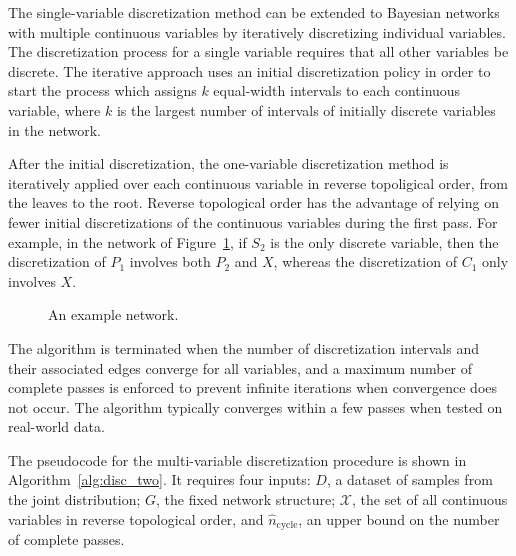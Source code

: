 \documentclass[twoside,11pt]{article}
\newcommand{\cX}{\mathcal{X}} %
\newcommand{\maxpasses}{\hat{n}_\text{cycle}}
\begin{document}
The single-variable discretization method can be extended to Bayesian networks with multiple continuous variables by iteratively discretizing individual variables.
The discretization process for a single variable requires that all other variables be discrete.
The iterative approach uses an initial discretization policy in order to start the process which assigns $k$ equal-width intervals to each continuous variable, where $k$ is the largest number of intervals of initially discrete variables in the network.

After the initial discretization, the one-variable discretization method is iteratively applied over each continuous variable in reverse topoligical order, from the leaves to the root.
Reverse topological order has the advantage of relying on fewer initial discretizations of the continuous variables during the first pass.
For example, in the network of Figure~\ref{fig:example_networks}, if $S_2$ is the only discrete variable, then the discretization of $P_1$ involves both $P_2$ and $X$, whereas the discretization of $C_1$ only involves $X$.

\begin{figure}[ht]
 \centering
     
  \caption{An example network.}
   \label{fig:example_networks}
\end{figure}

The algorithm is terminated when the number of discretization intervals and their associated edges converge for all variables, and a maximum number of complete passes is enforced to prevent infinite iterations when convergence does not occur.
The algorithm typically converges within a few passes when tested on real-world data.

The pseudocode for the multi-variable discretization procedure is shown in Algorithm~\ref{alg:disc_two}.
It requires four inputs: $D$, a dataset of samples from the joint distribution; $G$, the fixed network structure; $\bm{\cX}$, the set of all continuous variables in reverse topological order, and $\maxpasses$, an upper bound on the number of complete passes.
\end{document}
